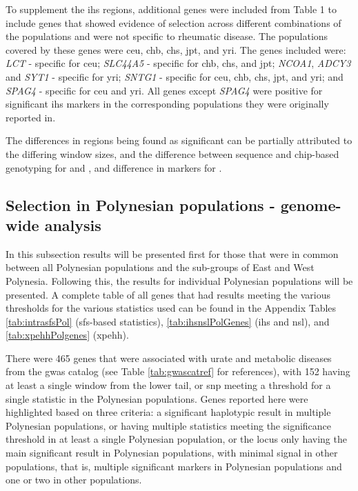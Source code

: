 \documentclass[]{report}
\begin{document}
To supplement the \citet{Ramos2017} \gls{ihs} regions, additional genes
were included from \citet{voight2006map} Table 1 to include genes that
showed evidence of selection across different combinations of the
populations and were not specific to rheumatic disease. The populations
covered by these genes were \gls{ceu}, \gls{chb}, \gls{chs}, \gls{jpt},
and \gls{yri}. The genes included were: \emph{LCT} - specific for
\gls{ceu}; \emph{SLC44A5} - specific for \gls{chb}, \gls{chs}, and
\gls{jpt}; \emph{NCOA1}, \emph{ADCY3} and \emph{SYT1} - specific for
\gls{yri}; \emph{SNTG1} - specific for \gls{ceu}, \gls{chb}, \gls{chs},
\gls{jpt}, and \gls{yri}; and \emph{SPAG4} - specific for \gls{ceu} and
\gls{yri}. All genes except \emph{SPAG4} were positive for significant
\gls{ihs} markers in the corresponding populations they were originally
reported in.

The differences in regions being found as significant can be partially
attributed to the differing window sizes, and the difference between
sequence and chip-based genotyping for \citet{Hider2013} and
\citet{Jonnalagadda2017}, and difference in markers for
\citet{Ramos2017}.

\FloatBarrier

\subsection{Selection in Polynesian populations - genome-wide
analysis}\label{selection-in-polynesian-populations---genome-wide-analysis}

In this subsection results will be presented first for those that were
in common between all Polynesian populations and the sub-groups of East
and West Polynesia. Following this, the results for individual
Polynesian populations will be presented. A complete table of all genes
that had results meeting the various thresholds for the various
statistics used can be found in the Appendix Tables
\ref{tab:intrasfsPol} (\gls{sfs}-based statistics),
\ref{tab:ihsnslPolGenes} (\gls{ihs} and \gls{nsl}), and
\ref{tab:xpehhPolgenes} (\gls{xpehh}).

There were 465 genes that were associated with urate and metabolic
diseases from the \gls{gwas} catalog (see Table \ref{tab:gwascatref} for
references), with 152 having at least a single window from the lower
tail, or \gls{snp} meeting a threshold for a single statistic in the
Polynesian populations. Genes reported here were highlighted based on
three criteria: a significant haplotypic result in multiple Polynesian
populations, or having multiple statistics meeting the significance
threshold in at least a single Polynesian population, or the locus only
having the main significant result in Polynesian populations, with
minimal signal in other populations, that is, multiple significant
markers in Polynesian populations and one or two in other populations.
\end{document}

